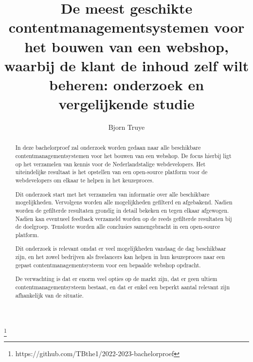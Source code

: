 \documentclass{hogent-article}
\title{De meest geschikte contentmanagementsystemen voor het bouwen van een webshop, waarbij de klant de inhoud zelf wilt beheren: onderzoek en vergelijkende studie}
\author{Bjorn Truye}
\begin{document}
\begin{abstract}
 In deze bachelorproef zal onderzoek worden gedaan naar alle beschikbare contentmanagementsystemen voor het bouwen van een webshop. De focus hierbij ligt op het verzamelen van kennis voor de Nederlandstalige webdevelopers. Het uiteindelijke resultaat is het opstellen van een open-source platform voor de webdevelopers om elkaar te helpen in het keuzeproces.
  
 Dit onderzoek start met het verzamelen van informatie over alle beschikbare mogelijkheden. Vervolgens worden alle mogelijkheden gefilterd en afgebakend. Nadien worden de gefilterde resultaten grondig in detail bekeken en tegen elkaar afgewogen. Nadien kan eventueel feedback verzameld worden op de reeds gefilterde resultaten bij de doelgroep. Tenslotte worden alle conclusies samengebracht in een open-source platform.   
 
 Dit onderzoek is relevant omdat er veel mogelijkheden vandaag de dag beschikbaar zijn, en het zowel bedrijven als freelancers kan helpen in hun keuzeproces naar een gepast contentmanagementsysteem voor een bepaalde webshop opdracht.
 
 De verwachting is dat er enorm veel opties op de markt zijn, dat er geen ultiem contentmanagementsysteem bestaat, en dat er enkel een beperkt aantal relevant zijn afhankelijk van de situatie.
   
\end{abstract}

\tableofcontents



\printbibliography[heading=bibintoc]

\footnote{https://github.com/TBthe1/2022-2023-bachelorproef}
\end{document}

